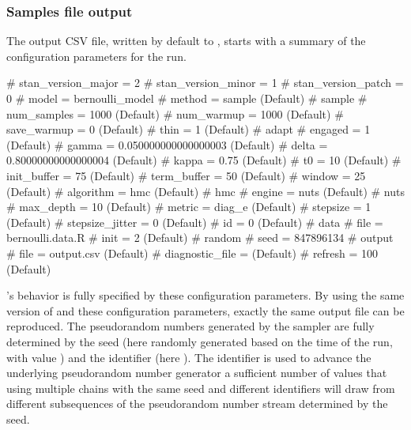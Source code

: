 \documentclass[article]{jss}
\begin{document}
\subsubsection{Samples file output}

The output CSV file, written by default to , starts
with a summary of the configuration parameters for the run.
%
\begin{Code}
# stan_version_major = 2
# stan_version_minor = 1
# stan_version_patch = 0
# model = bernoulli_model
# method = sample (Default)
#   sample
#     num_samples = 1000 (Default)
#     num_warmup = 1000 (Default)
#     save_warmup = 0 (Default)
#     thin = 1 (Default)
#     adapt
#       engaged = 1 (Default)
#       gamma = 0.050000000000000003 (Default)
#       delta = 0.80000000000000004 (Default)
#       kappa = 0.75 (Default)
#       t0 = 10 (Default)
#       init_buffer = 75 (Default)
#       term_buffer = 50 (Default)
#       window = 25 (Default)
#     algorithm = hmc (Default)
#       hmc
#         engine = nuts (Default)
#           nuts
#             max_depth = 10 (Default)
#         metric = diag_e (Default)
#         stepsize = 1 (Default)
#         stepsize_jitter = 0 (Default)
# id = 0 (Default)
# data
#   file = bernoulli.data.R
# init = 2 (Default)
# random
#   seed = 847896134
# output
#   file = output.csv (Default)
#   diagnostic_file =  (Default)
#   refresh = 100 (Default)
\end{Code}
%
's behavior is fully specified by these configuration
parameters.  By using the same version of  and these
configuration parameters, exactly the same output file can be
reproduced.  The pseudorandom numbers generated by the sampler are
fully determined by the seed (here randomly generated based on the
time of the run, with value ) and the identifier (here
).  The identifier is used to advance the underlying
pseudorandom number generator a sufficient number of values that
using multiple chains with the same seed and different identifiers
will draw from different subsequences of the pseudorandom number
stream determined by the seed.
\end{document}
